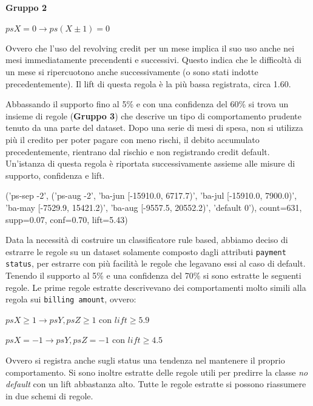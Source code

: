 \paragraph{Gruppo 2}
\begin{center}
	$psX =0 \rightarrow ps(X \pm 1) = 0$
\end{center}

Ovvero che l'uso del revolving credit per un mese implica il suo uso anche nei mesi
immediatamente precendenti e successivi. Questo indica che le difficolt\`a di un
mese si ripercuotono anche successivamente (o sono stati indotte precedentemente).
Il lift di questa regola \`e la pi\`u bassa registrata, circa 1.60.

Abbassando il supporto fino al 5\% e con una confidenza del 60\% si trova un
insieme di regole (\textbf{Gruppo 3}) che descrive un tipo di comportamento prudente
tenuto da una parte del dataset. Dopo una serie di mesi di spesa, non si utilizza
pi\`u il credito per poter pagare con meno rischi, il debito accumulato
precedentemente, rientrano dal rischio e non registrando credit default.
Un'istanza di questa regola \`e riportata successivamente assieme alle misure di
supporto, confidenza e lift.

\begin{center}
	('ps-sep -2', ('ps-aug -2', 'ba-jun [-15910.0, 6717.7)', 'ba-jul [-15910.0, 7900.0)', 'ba-may [-7529.9, 15421.2)', 'ba-aug [-9557.5, 20552.2)', 'default 0'), count=631, supp=0.07, conf=0.70, lift=5.43)
\end{center}

Data la necessit\`a di costruire un classificatore rule based, abbiamo deciso
di estrarre le regole su un dataset solamente composto dagli attributi
\texttt{payment status}, per estrarre con pi\`u facilit\`a le regole che legavano
essi al caso di default. Tenendo il supporto al 5\% e una confidenza del 70\% si
sono estratte le seguenti regole.
Le prime regole estratte descrivevano dei comportamenti molto simili alla regola
sui \texttt{billing amount}, ovvero:

\begin{center}
	$psX \geq 1 \rightarrow psY, psZ \geq 1$ con $lift \geq 5.9$
	
	$psX = -1 \rightarrow psY, psZ = -1$ con $lift \geq 4.5$
\end{center}

Ovvero si registra anche sugli status una tendenza nel mantenere il proprio
comportamento. Si sono inoltre estratte delle regole utili per predirre
la classe \textit{no default} con un lift abbastanza alto. Tutte le regole
estratte si possono riassumere in due schemi di regole.

